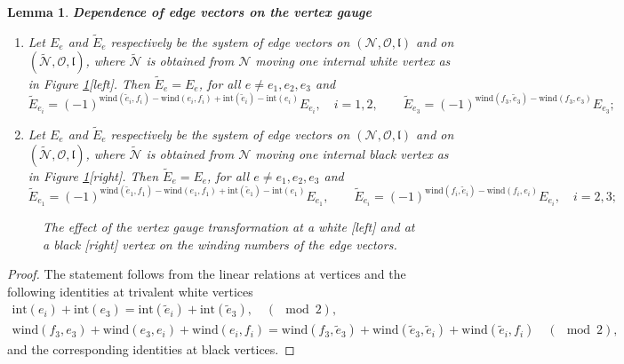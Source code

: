 \documentclass[11pt]{amsart}
\theoremstyle{plain}
\numberwithin{equation}{section}
\newtheorem{lemma}[theorem]{Lemma}
\begin{document}
\begin{lemma}\label{lem:vertex_gauge}\textbf{Dependence of edge vectors on the vertex gauge}
\begin{enumerate}
\item Let $E_e$ and ${\tilde E}_e$ respectively be the system of edge vectors on $({\mathcal N}, {\mathcal O}, \mathfrak{l})$ and on $({\tilde {\mathcal N}}, {\mathcal O}, \mathfrak{l})$, where ${\tilde {\mathcal N}}$ is obtained from ${\mathcal N}$ moving one internal white vertex as in Figure \ref{fig:vertex_gauge_vectors}[left]. Then ${\tilde E}_e =E_e$, for all $e\not = e_1,e_2,e_3$ and
\begin{equation}\label{eq:white_vertex_gauge}
{\tilde E}_{e_i} = (-1)^{\mbox{wind}({\tilde e}_i,f_i)- \mbox{wind}(e_i,f_i)+\mbox{int}({\tilde e}_i)-\mbox{int}(e_i)} E_{e_i}, \quad i=1,2,
\quad\quad
{\tilde E}_{e_3} = (-1)^{\mbox{wind}(f_3,{\tilde e}_3)-\mbox{wind}(f_3,e_3)  } E_{e_3};
\end{equation}
\item Let $E_e$ and ${\tilde E}_e$ respectively be the system of edge vectors on $({\mathcal N}, {\mathcal O}, \mathfrak{l})$ and on $({\tilde {\mathcal N}}, {\mathcal O}, \mathfrak{l})$, where ${\tilde {\mathcal N}}$ is obtained from ${\mathcal N}$ moving one internal black vertex as in Figure \ref{fig:vertex_gauge_vectors}[right]. Then ${\tilde E}_e =E_e$, for all $e\not = e_1,e_2,e_3$ and
\[
{\tilde E}_{e_1} = (-1)^{\mbox{wind}({\tilde e}_1,f_1)- \mbox{wind}(e_1,f_1)+\mbox{int}({\tilde e}_1)-\mbox{int}(e_1)} E_{e_1},
\quad\quad
{\tilde E}_{e_i} = (-1)^{\mbox{wind}(f_i,{\tilde e}_i)-\mbox{wind}(f_i,e_i)  } E_{e_i}, \quad i=2,3;
\]
\end{enumerate}
\end{lemma}

\begin{figure}
	\vspace{-.9 truecm}
  \caption{\small{\sl The effect of the vertex gauge transformation at a white [left] and at a black [right] vertex on the winding numbers of the edge vectors.}\label{fig:vertex_gauge_vectors}}
\end{figure}

\begin{proof}
The statement follows from the linear relations at vertices and the following identities at trivalent white vertices
\begin{equation}\label{eq:int_vertex_gauge}
\begin{array}{c}
\mbox{int} (e_i) +\mbox{int} (e_3) =\mbox{int} ({\tilde e}_i) +\mbox{int} ({\tilde e}_3), \quad (\!\!\!\!\!\!\mod 2),\\
\mbox{wind}(f_3,e_3) +  \mbox{wind}(e_3,e_i) +  \mbox{wind}(e_i,f_i) = \mbox{wind}(f_3,{\tilde e}_3) +  \mbox{wind}({\tilde e}_3,{\tilde e}_i) +  \mbox{wind}({\tilde e}_i,f_i) \quad (\!\!\!\!\!\!\mod 2),
\end{array}
\end{equation}
and the corresponding identities at black vertices.
\end{proof}
\end{document}

